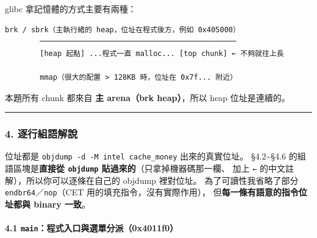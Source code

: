 \documentclass[10pt,a4paper]{article}
\renewenvironment{quote}{%
  \begin{mdframed}[linewidth=0pt,innerleftmargin=0pt,innerrightmargin=0pt,
    innerbottommargin=0pt,innertopmargin=0pt,skipabove=0.55em,skipbelow=0.55em,
    leftmargin=0.9em,rightmargin=0.4em,startcode={\color{quotebar}\vrule width 2.6pt},%
    endcode={}]%
  \itshape\color{black}%
}{%
  \end{mdframed}%
}
\begin{document}
glibc 拿記憶體的方式主要有兩種：

\begin{Verbatim}[breaklines=true,breakanywhere=true,breakautoindent=false,fontsize=\fontsize{7.0}{9.5}\selectfont]
        brk / sbrk（主執行緒的 heap，位址在程式後方，例如 0x405000）
        ─────────────────────────────────────────────
        [heap 起點] ...程式一直 malloc... [top chunk] ← 不夠就往上長

        mmap（很大的配置 > 128KB 時，位址在 0x7f... 附近）
\end{Verbatim}

本題所有 chunk 都來自 \textbf{主 arena（brk heap）}，所以 heap
位址是連續的。

\begin{center}\rule{0.5\linewidth}{0.5pt}\end{center}

\subsubsection{4.
逐行組語解說}\label{ux9010ux884cux7d44ux8a9eux89e3ux8aaa}

\begin{quote}
位址都是 \texttt{objdump\ \allowbreak{}-\allowbreak{}d\ \allowbreak{}-\allowbreak{}M\ \allowbreak{}intel\ \allowbreak{}cache\_\allowbreak{}money} 出來的真實位址。
§4.2\textasciitilde§4.6 的組語區塊是\textbf{直接從 \texttt{objdump}
貼過來的}（只拿掉機器碼那一欄、 加上 \texttt{←}
的中文註解），所以你可以逐條在自己的 objdump 裡對位址。
為了可讀性我省略了部分 \texttt{endbr64}／\texttt{nop}（CET
用的填充指令，沒有實際作用）， 但\textbf{每一條有語意的指令位址都與
binary 一致}。
\end{quote}

\paragraph{\texorpdfstring{4.1
\texttt{main}：程式入口與選單分派（0x4011f0）}{4.1 main：程式入口與選單分派（0x4011f0）}}\label{mainux7a0bux5f0fux5165ux53e3ux8207ux9078ux55aeux5206ux6d3e0x4011f0}
\end{document}
